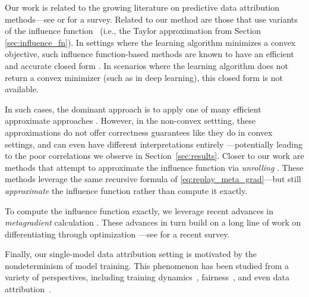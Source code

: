 Our work is related to the growing literature on predictive data attribution
methods---see \citet{ilyas2024data} or \citet{hammoudeh2022training} for 
a survey. 
Related to our method are those that use variants of the influence
function~\citep{hampel2011robust} (i.e., the Taylor 
approximation from Section \ref{sec:influence_fn}). 
In settings where the learning algorithm 
minimizes a convex objective, such influence function-based methods 
are known to have an efficient and accurate closed form 
\citep{rad2018scalable,koh2019accuracy,giordano2019swiss,nobel2024randalo}.
In scenarios where the learning algorithm does not return
a convex minimizer (such as in deep learning), 
this closed form is not available.

In such cases, the dominant approach is to apply one of many
efficient approximate approaches
\citep{koh2017understanding,ladhak2022tracing,schioppa2022scaling,park2023trak,grosse2023studying}.
However, in the non-convex settting, these approximations 
do not offer correctness guarantees like they do in convex settings,
and can even have different interpretations entirely \citep{bae2022if}---potentially 
leading to the poor correlations we observe in Section~\ref{sec:results}.
Closer to our work are methods that attempt to approximate the influence function 
via {\em unrolling} \citep{bae2024training}. These methods leverage 
the same recursive formula of \eqref{eq:replay_meta_grad}---but 
still {\em approximate} the influence function rather than compute it exactly.

To compute the influence function exactly,
we leverage recent advances in {\em metagradient} calculation 
\citep{engstrom2025optimizing}. These advances in turn build on 
a long line of work on differentiating through optimization 
\citep{maclaurin2015gradient,lorraine2020optimizing}---see 
\citet{engstrom2025optimizing} for a recent survey.

Finally, our single-model data attribution setting is motivated by the 
nondeterminism of model training. 
This phenomenon has been studied from a variety of perspectives, 
including training dynamics~\citep{zhuang2022randomness,jordan2024variance}, 
fairness~\citep{black2022model,marx2020predictive}, 
and even data attribution~\citep{ilyas2022datamodels,nguyen2023bayesian}.

